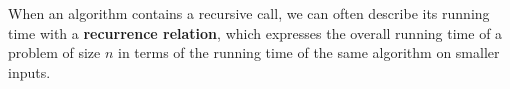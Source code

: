 When an algorithm contains a recursive call, we can often describe its running time with a \textbf{recurrence relation}, which expresses the overall running time of a problem of size $n$ in terms of the running time of the same algorithm on smaller inputs.




